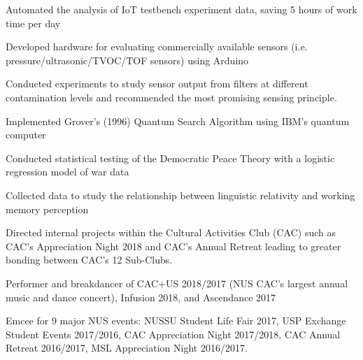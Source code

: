 \documentclass[]{deedy-resume-openfont}
\begin{document}
\begin{minipage}[t]{0.65\textwidth}
\vspace{\topsep} %
\begin{tightemize}
\item Automated the analysis of IoT testbench experiment data, saving 5 hours of work time per day
\item Developed hardware for evaluating commercially available sensors (i.e. pressure/ultrasonic/TVOC/TOF sensors) using Arduino
\item Conducted experiments to study sensor output from filters at different contamination levels and recommended the most promising sensing principle. %
\end{tightemize}
\sectionsep

\begin{tightemize}
\item Implemented Grover’s (1996) Quantum Search Algorithm using IBM’s quantum computer
\item Conducted statistical testing of the Democratic Peace Theory with a logistic regression model of war data
\item Collected data to study the relationship between linguistic relativity and working memory perception
\end{tightemize}
\sectionsep

\begin{tightemize}
\item Directed internal projects within the Cultural Activities Club (CAC) such as CAC’s Appreciation Night 2018 and CAC’s Annual Retreat leading to greater bonding between CAC’s 12 Sub-Clubs.
\item Performer and breakdancer of CAC+US 2018/2017 (NUS CAC's largest annual music and dance concert), Infusion 2018, and Ascendance 2017
\item Emcee for 9 major NUS events: NUSSU Student Life Fair 2017, USP Exchange Student Events 2017/2016, CAC Appreciation Night 2017/2018, CAC Annual Retreat 2016/2017, MSL Appreciation Night 2016/2017.
\end{tightemize}
\sectionsep


\end{minipage} 
\end{document}
